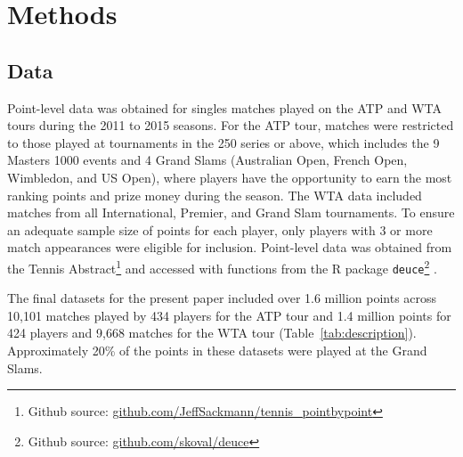 \documentclass{Latex/svjour3}
\begin{document}
\section{Methods}

\subsection{Data}

Point-level data was obtained for singles matches played on the ATP and WTA
tours during the 2011 to 2015 seasons. For the ATP tour, matches were restricted
to those played at tournaments in the 250 series or above, which includes the 9
Masters 1000 events and 4 Grand Slams (Australian Open, French Open, Wimbledon,
and US Open), where players have the opportunity to earn the most ranking points
and prize money during the season. The WTA data included matches from all
International, Premier, and Grand Slam tournaments. To ensure an adequate sample
size of points for each player, only players with 3 or more match appearances
were eligible for inclusion. Point-level data was obtained from the Tennis
Abstract\footnote{Github source:
  \url{github.com/JeffSackmann/tennis_pointbypoint}} and accessed with functions
from the R package \texttt{deuce}\footnote{Github source:
  \url{github.com/skoval/deuce}} .

The final datasets for the present paper included over 1.6 million points across
10,101 matches played by 434 players for the ATP tour and 1.4 million points for
424 players and 9,668 matches for the WTA tour
(Table~\ref{tab:description}). Approximately 20\% of the points in these
datasets were played at the Grand Slams.
\end{document}
